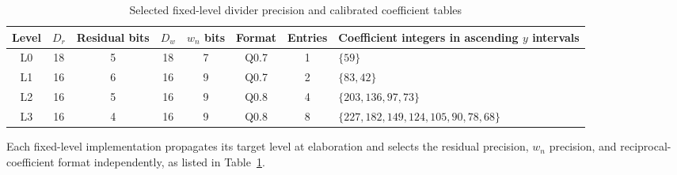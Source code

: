 \documentclass[conference]{IEEEtran}
\begin{document}
\begin{table}[t]
\caption{Selected fixed-level divider precision and calibrated coefficient tables}
\label{tab:LSB-truncation}
\centering\scriptsize
\begin{tabular}{cccccccl}
\toprule
Level & $D_r$ & Residual bits & $D_w$ & $w_n$ bits & Format & Entries &
Coefficient integers in ascending $y$ intervals \\
\midrule
L0 & 18 & 5 & 18 & 7 & Q0.7 & 1 & $\{59\}$ \\
L1 & 16 & 6 & 16 & 9 & Q0.7 & 2 & $\{83,42\}$ \\
L2 & 16 & 5 & 16 & 9 & Q0.8 & 4 & $\{203,136,97,73\}$ \\
L3 & 16 & 4 & 16 & 9 & Q0.8 & 8 &
$\{227,182,149,124,105,90,78,68\}$ \\
\bottomrule
\end{tabular}
\end{table}

Each fixed-level implementation propagates its target level at elaboration and
selects the residual precision, $w_n$ precision, and reciprocal-coefficient
format independently, as listed in Table~\ref{tab:LSB-truncation}.
\end{document}

